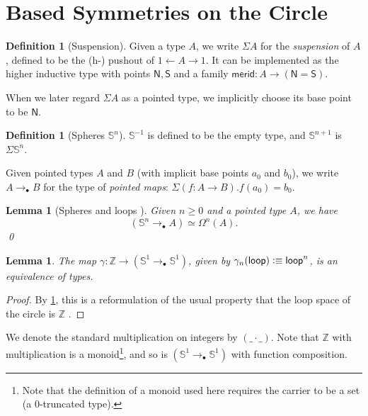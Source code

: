 \documentclass[11pt,a4paper,oneside,reqno]{amsart}
\newtheorem{lemma}[theorem]{Lemma}
\theoremstyle{definition}
\newtheorem{definition}[theorem]{Definition}
\theoremstyle{remark}
\newcommand{\Z}{\mathbb Z}
\newcommand{\sph}[1]{{\mathbb S}^{#1}}
\newcommand{\defeq}{\vcentcolon\equiv}
\newcommand{\North}{\mathsf N}
\newcommand{\South}{\mathsf S}
\newcommand{\merid}{\mathsf{merid}}
\newcommand{\pointedm}{\rightarrow_\bullet}
\newcommand{\lo}{\mathsf{loop}}
\begin{document}
\section{Based Symmetries on the Circle}

\begin{definition}[Suspension]
 Given a type $A$, we write $\Sigma A$ for the \emph{suspension} of $A$, defined to be the (h-) pushout of $1 \leftarrow A \rightarrow 1$.
 It can be implemented as the higher inductive type with points $\North, \South$ and a family $\merid : A \to (\North = \South)$.
\end{definition}

When we later regard $\Sigma A$ as a pointed type, we implicitly choose its base point to be $\North$.

\begin{definition}[Spheres $\sph n$]
 $\sph {-1}$ is defined to be the empty type, and $\sph {n+1}$ is $\Sigma \sph n$.
\end{definition}

Given pointed types $A$ and $B$ (with implicit base points $a_0$ and $b_0$), we write $A \pointedm B$ for the type of \emph{pointed maps}: $\Sigma (f : A \to B). f(a_0) = b_0$.

\begin{lemma}[{Spheres and loops \cite[check-lemma-number]{HoTT}}] \label{lem:sph-loops}
 Given $n \geq 0$ and a pointed type $A$, we have
 \begin{equation}
  (\sph n \pointedm A) \simeq \Omega^n(A).
 \end{equation}
 \qed
\end{lemma}

\begin{lemma}
 The map $\gamma : \Z \to (\sph 1 \pointedm \sph 1)$, given by $\gamma_n (\lo) \defeq \lo^n$, is an equivalence of types.
\end{lemma}
\begin{proof}
 By \cref{lem:sph-loops}, this is a reformulation of the usual property that the loop space of the circle is $\Z$ \cite[Chp 8.1]{HoTT}.
\end{proof}

We denote the standard multiplication on integers by $(\_ \cdot \_)$.
Note that $\Z$ with multiplication is a monoid\footnote{Note that the definition of a monoid used here requires the carrier to be a set (a $0$-truncated type).}, and so is $(\sph 1 \pointedm \sph 1)$ with function composition.
\end{document}
